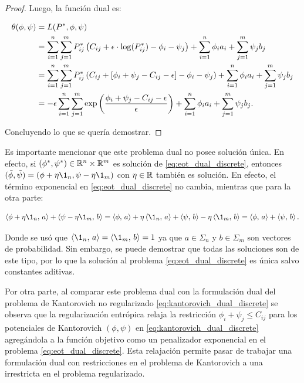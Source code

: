 \begin{proof}
	Luego, la función dual es:

	\begin{align*}
		\theta(\phi,\psi) & = L(P^*,\phi,\psi)\\
		                  & = \sum_{i=1}^n\sum_{j=1}^m P_{ij}^* \left( C_{ij} + \epsilon\cdot\log(P_{ij}^*)- \phi_i-\psi_j \right) + \sum_{i=1}^n \phi_i a_i + \sum_{j=1}^m \psi_j b_j\\
		                  & = \sum_{i=1}^n\sum_{j=1}^m P_{ij}^* \left( C_{ij} + [\phi_i+\psi_j-C_{ij}-\epsilon] - \phi_i-\psi_j \right) + \sum_{i=1}^n \phi_i a_i + \sum_{j=1}^m \psi_j b_j\\
		                  & = -\epsilon \sum_{i=1}^n\sum_{j=1}^m \exp\left(\frac{\phi_i + \psi_j-C_{ij} - \epsilon}{\epsilon}\right) + \sum_{i=1}^n \phi_i a_i + \sum_{j=1}^m \psi_j b_j .
	\end{align*}

	Concluyendo lo que se quería demostrar.
\end{proof}

Es importante mencionar que este problema dual no posee solución única. En efecto, si $(\phi^*,\psi^*)\in\mathbb{R}^n\times\mathbb{R}^m$ es solución de \eqref{eq:eot_dual_discrete}, entonces $(\tilde{\phi},\tilde{\psi}) = (\phi + \eta\1_n, \psi - \eta\1_m)$ con $\eta\in\mathbb{R}$ también es solución. En efecto, el término exponencial en \eqref{eq:eot_dual_discrete} no cambia, mientras que para la otra parte:

\begin{equation*}
	\dotproduct{\phi + \eta\1_n}{a} + \dotproduct{\psi - \eta\1_m}{b}
	= \dotproduct{\phi}{a} + \eta\dotproduct{\1_n}{a} + \dotproduct{\psi}{b} - \eta\dotproduct{\1_m}{b}
	= \dotproduct{\phi}{a} + \dotproduct{\psi}{b} .
\end{equation*}

Donde se usó que $\dotproduct{\1_n}{a}=\dotproduct{\1_m}{b}=1$ ya que $a\in\Sigma_n$ y $b\in\Sigma_m$ son vectores de probabilidad. Sin embargo, se puede demostrar que todas las soluciones son de este tipo, por lo que la solución al problema \eqref{eq:eot_dual_discrete} es única salvo constantes aditivas.

Por otra parte, al comparar este problema dual con la formulación dual del problema de Kantorovich no regularizado \eqref{eq:kantorovich_dual_discrete} se observa que la regularización entrópica relaja la restricción $\phi_i+\psi_j \leq C_{ij}$ para los potenciales de Kantorovich $(\phi,\psi)$ en \eqref{eq:kantorovich_dual_discrete} agregándola a la función objetivo como un penalizador exponencial en el problema \eqref{eq:eot_dual_discrete}. Esta relajación permite pasar de trabajar una formulación dual con restricciones en el problema de Kantorovich a una irrestricta en el problema regularizado.

